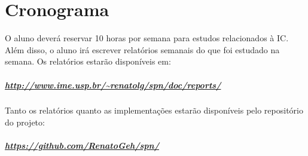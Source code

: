 \documentclass[a4paper,10pt]{article}
\theoremstyle{plain}
\begin{document}
\section{Cronograma}

O aluno deverá reservar 10 horas por semana para estudos relacionados à IC. Além disso, o aluno
irá escrever relatórios semanais do que foi estudado na semana. Os relatórios estarão disponíveis
em:

\subparagraph{\url{http://www.ime.usp.br/~renatolg/spn/doc/reports/}}

Tanto os relatórios quanto as implementações estarão disponíveis pelo repositório do projeto:

\subparagraph{\url{https://github.com/RenatoGeh/spn/}}

\newpage

\printbibliography
\end{document}
